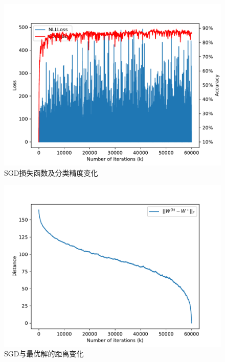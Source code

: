 \documentclass[logo,reportComp]{thesis}
\begin{document}
\begin{minipage}{0.5\linewidth}
\begin{figure}[H]
\centering
\includegraphics[width=\linewidth]{fig/p2-sgd-acc.pdf}
\caption{SGD损失函数及分类精度变化}
\label{fig:p2-acc-sgd}
\end{figure}
\end{minipage}
\begin{minipage}{0.5\linewidth}
\begin{figure}[H]
\centering
\includegraphics[width=\linewidth]{fig/p2-sgd-opt-dist.pdf}
\caption{SGD与最优解的距离变化}
\label{fig:p2-opt-dist-sgd}
\end{figure}
\end{minipage}
\end{document}

